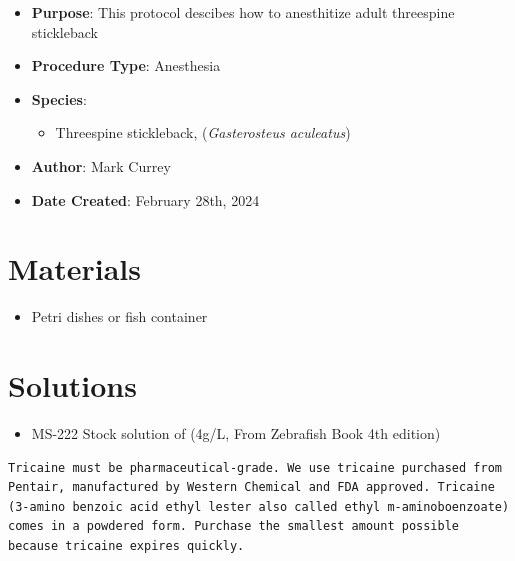 \documentclass[
  letterpaper,
  DIV=11,
  numbers=noendperiod]{scrreprt}
\providecommand{\tightlist}{%
  \setlength{\itemsep}{0pt}\setlength{\parskip}{0pt}}\usepackage{longtable,booktabs,array}
\begin{document}
\begin{itemize}
\tightlist
\item
  \textbf{Purpose}: This protocol descibes how to anesthitize adult
  threespine stickleback
\item
  \textbf{Procedure Type}: Anesthesia
\item
  \textbf{Species}:

  \begin{itemize}
  \tightlist
  \item
    Threespine stickleback, (\emph{Gasterosteus aculeatus})
  \end{itemize}
\item
  \textbf{Author}: Mark Currey\\
\item
  \textbf{Date Created}: February 28th, 2024
\end{itemize}

\hypertarget{materials-43}{%
\section{Materials}\label{materials-43}}

\begin{itemize}
\tightlist
\item
  Petri dishes or fish container
\end{itemize}

\hypertarget{solutions-34}{%
\section{Solutions}\label{solutions-34}}

\begin{itemize}
\tightlist
\item
  MS-222 Stock solution of (4g/L, From Zebrafish Book 4th edition)
\end{itemize}

\begin{tcolorbox}[enhanced jigsaw, rightrule=.15mm, title=\textcolor{quarto-callout-warning-color}{\faExclamationTriangle}\hspace{0.5em}{NOTES}, titlerule=0mm, opacitybacktitle=0.6, toprule=.15mm, bottomrule=.15mm, opacityback=0, left=2mm, colframe=quarto-callout-warning-color-frame, breakable, coltitle=black, colback=white, colbacktitle=quarto-callout-warning-color!10!white, bottomtitle=1mm, leftrule=.75mm, toptitle=1mm, arc=.35mm]

\begin{verbatim}
Tricaine must be pharmaceutical-grade. We use tricaine purchased from Pentair, manufactured by Western Chemical and FDA approved. Tricaine (3-amino benzoic acid ethyl lester also called ethyl m-aminoboenzoate) comes in a powdered form. Purchase the smallest amount possible because tricaine expires quickly.
\end{verbatim}

\end{tcolorbox}
\end{document}
